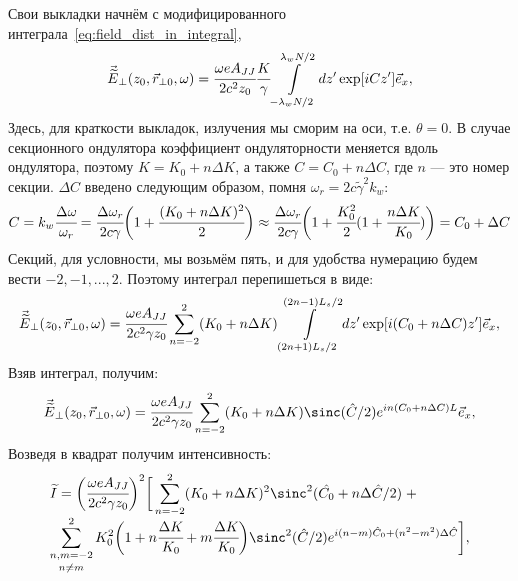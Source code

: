 Свои выкладки начнём с модифицированного интеграла~\ref{eq:field_dist_in_integral}, 
\begin{equation}
\begin{array}{lcl}
\vec{\widetilde{E}}_{\bot}(z_0,  \vec{r}_{\bot 0}, \omega) =
\cfrac{\omega eA_{JJ}}{2c^2z_0}\cfrac{K}{\gamma}
\displaystyle\int\limits_{-\lambda_w N/2}^{\lambda_w N/2} dz'
\exp[iCz'] 	\vec{e}_x,
\end{array}	
\end{equation} 
Здесь, для краткости выкладок, излучения мы сморим на оси, т.е. $\theta = 0$. В случае секционного ондулятора коэффициент ондуляторности меняется вдоль ондулятора, поэтому $K = K_0 + n\Delta K$, а также $C = C_0 + n\Delta C$, где $n$ --- это номер секции. $\Delta {C}$ введено следующим образом, помня $\omega_r = 2c\widetilde{\gamma}^2k_w$:
\begin{equation}
C =k_w\cfrac{\Delta \omega}{\omega_r} = \cfrac{\Delta \omega_r}{2c\gamma}\bigg(1 + \cfrac{(K_0 + n\Delta K)^2}{2}\bigg) \approx \cfrac{\Delta \omega_r}{2c\gamma}\bigg(1 + \cfrac{K^2_0}{2}(1 + \cfrac{n\Delta K}{K_0})\bigg) = C_0 + \Delta C
\end{equation} 
Секций, для условности, мы возьмём пять, и для удобства нумерацию будем вести $-2, -1, ... , 2$. Поэтому интеграл перепишеться в виде:
\begin{equation}
\begin{array}{lcl}
\vec{\widetilde{E}}_{\bot}(z_0,  \vec{r}_{\bot 0}, \omega) =
\cfrac{\omega eA_{JJ}}{2c^2 \gamma z_0}
\displaystyle\sum\limits_{n =-2}^{2}(K_0 + n\Delta K)
\displaystyle\int\limits_{(2n + 1)L_s/2}^{(2n - 1)L_s/2} dz'
\exp[i(C_0 + n\Delta C)z']	\vec{e}_x,
\end{array}	
\end{equation} 
Взяв интеграл, получим:
\begin{equation}
\begin{array}{lcl}
\vec{\widetilde{E}}_{\bot}(z_0,  \vec{r}_{\bot 0}, \omega) =
\cfrac{\omega eA_{JJ}}{2c^2 \gamma z_0}
\displaystyle\sum\limits_{n =-2}^{2}(K_0 + n\Delta K)
\sinc(\hat{C}/2)e^{in({C}_0 + n\Delta {C})L}	\vec{e}_x,
\end{array}	
\end{equation} 
Возведя в квадрат получим интенсивность:
\begin{equation}
\begin{array}{lcl}
{\widetilde{I}} =
\bigg(\cfrac{\omega eA_{JJ}}{2c^2 \gamma z_0}\bigg)^2\bigg[
\displaystyle\sum\limits_{n =-2}^{2}(K_0 + n\Delta K)^2\sinc^2(\hat{C_0} + n\Delta \hat{C}/2) \; + \\

\displaystyle\mathop{\sum\limits_{n, m =-2}^{2}}_{n \neq m}K^2_0\bigg(1 + n\cfrac{\Delta K}{K_0} + m\cfrac{\Delta K}{K_0}\bigg)
\sinc^2(\hat{C}/2)e^{i(n-m)\hat{C}_0 + (n^2 - m^2)\Delta \hat{C}}\bigg],
\end{array}	
\end{equation} 
